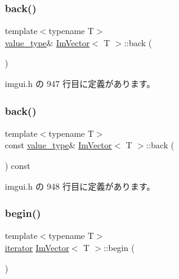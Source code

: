 \subsubsection{\texorpdfstring{back()}{back()}\hspace{0.1cm}{\footnotesize\ttfamily [1/2]}}
{\footnotesize\ttfamily template$<$typename T$>$ \\
\mbox{\hyperlink{class_im_vector_a8bd77e4e7581d8e5f9e98d7c2f3c2a80}{value\+\_\+type}}\& \mbox{\hyperlink{class_im_vector}{Im\+Vector}}$<$ T $>$\+::back (\begin{DoxyParamCaption}{ }\end{DoxyParamCaption})\hspace{0.3cm}{\ttfamily [inline]}}



 imgui.\+h の 947 行目に定義があります。

\mbox{\label{class_im_vector_a6f22918d4f139a1c4c3410ccae726f81}} 
\subsubsection{\texorpdfstring{back()}{back()}\hspace{0.1cm}{\footnotesize\ttfamily [2/2]}}
{\footnotesize\ttfamily template$<$typename T$>$ \\
const \mbox{\hyperlink{class_im_vector_a8bd77e4e7581d8e5f9e98d7c2f3c2a80}{value\+\_\+type}}\& \mbox{\hyperlink{class_im_vector}{Im\+Vector}}$<$ T $>$\+::back (\begin{DoxyParamCaption}{ }\end{DoxyParamCaption}) const\hspace{0.3cm}{\ttfamily [inline]}}



 imgui.\+h の 948 行目に定義があります。

\mbox{\label{class_im_vector_a300a8b559cd87a78063046ef81151bce}} 
\subsubsection{\texorpdfstring{begin()}{begin()}\hspace{0.1cm}{\footnotesize\ttfamily [1/2]}}
{\footnotesize\ttfamily template$<$typename T$>$ \\
\mbox{\hyperlink{class_im_vector_a74b5478f1f6fd471cc71219bce483db6}{iterator}} \mbox{\hyperlink{class_im_vector}{Im\+Vector}}$<$ T $>$\+::begin (\begin{DoxyParamCaption}{ }\end{DoxyParamCaption})\hspace{0.3cm}{\ttfamily [inline]}}




